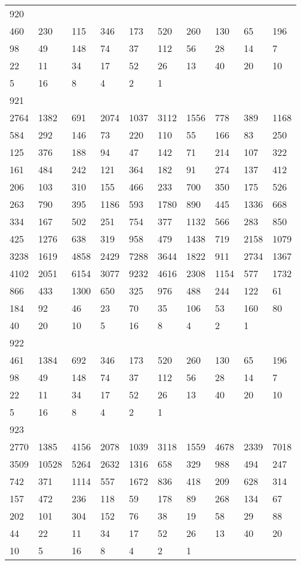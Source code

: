 \begin{longtable}{*{10}{l}}
920&&&&&&&&&\\
460& 230& 115& 346& 173& 520& 260& 130& 65& 196\\
98& 49& 148& 74& 37& 112& 56& 28& 14& 7\\
22& 11& 34& 17& 52& 26& 13& 40& 20& 10\\
5& 16& 8& 4& 2& 1& \\

921&&&&&&&&&\\
2764& 1382& 691& 2074& 1037& 3112& 1556& 778& 389& 1168\\
584& 292& 146& 73& 220& 110& 55& 166& 83& 250\\
125& 376& 188& 94& 47& 142& 71& 214& 107& 322\\
161& 484& 242& 121& 364& 182& 91& 274& 137& 412\\
206& 103& 310& 155& 466& 233& 700& 350& 175& 526\\
263& 790& 395& 1186& 593& 1780& 890& 445& 1336& 668\\
334& 167& 502& 251& 754& 377& 1132& 566& 283& 850\\
425& 1276& 638& 319& 958& 479& 1438& 719& 2158& 1079\\
3238& 1619& 4858& 2429& 7288& 3644& 1822& 911& 2734& 1367\\
4102& 2051& 6154& 3077& 9232& 4616& 2308& 1154& 577& 1732\\
866& 433& 1300& 650& 325& 976& 488& 244& 122& 61\\
184& 92& 46& 23& 70& 35& 106& 53& 160& 80\\
40& 20& 10& 5& 16& 8& 4& 2& 1& \\

922&&&&&&&&&\\
461& 1384& 692& 346& 173& 520& 260& 130& 65& 196\\
98& 49& 148& 74& 37& 112& 56& 28& 14& 7\\
22& 11& 34& 17& 52& 26& 13& 40& 20& 10\\
5& 16& 8& 4& 2& 1& \\

923&&&&&&&&&\\
2770& 1385& 4156& 2078& 1039& 3118& 1559& 4678& 2339& 7018\\
3509& 10528& 5264& 2632& 1316& 658& 329& 988& 494& 247\\
742& 371& 1114& 557& 1672& 836& 418& 209& 628& 314\\
157& 472& 236& 118& 59& 178& 89& 268& 134& 67\\
202& 101& 304& 152& 76& 38& 19& 58& 29& 88\\
44& 22& 11& 34& 17& 52& 26& 13& 40& 20\\
10& 5& 16& 8& 4& 2& 1& \\


\end{longtable}
